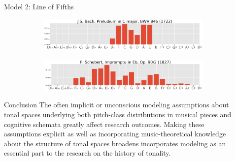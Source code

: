 \documentclass[final]{beamer}
\begin{document}
\begin{frame}[t]
\begin{minipage}[t][.56\textheight][t]{\textwidth}
\begin{columns}[t]
\begin{column}{0.3\textwidth}
\begin{block}{Model 2: Line of Fifths}
\begin{figure}
				\vspace{1em} %

				\begin{subfigure}{\textwidth} %
					\includegraphics[width=\textwidth]{img/gmm_bach.png}
				\end{subfigure}

				\vspace{1em} %

				\begin{subfigure}{\textwidth} %
					\includegraphics[width=\textwidth]{img/gmm_schubert.png}
				\end{subfigure}
			\end{figure}
      \end{block}

			\begin{block}{Conclusion}
        The often implicit or unconscious \alert{modeling assumptions about tonal spaces}
        underlying both pitch-class distributions in musical pieces and cognitive schemata
        greatly affect research outcomes. Making these assumptions explicit
        as well as incorporating music-theoretical knowledge about the
        structure of tonal spaces broadens incorporates modeling as an essential part
        to the research on the history of tonality.

      \end{block}

    \end{column}

    \begin{column}{0.3\textwidth}


\end{column}
\end{columns}
\end{minipage}
\end{frame}
\end{document}
